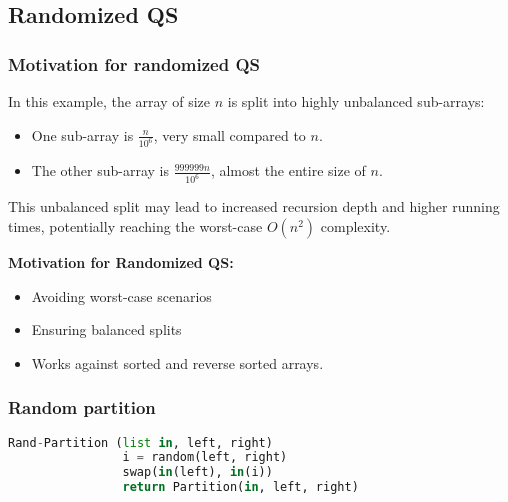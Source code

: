 \subsection{Randomized QS} 
    \subsubsection{Motivation for randomized QS}
    \begin{example}
        \begin{center}
        \end{center}
        
        \noindent In this example, the array of size \( n \) is split into highly unbalanced sub-arrays:
        \begin{itemize}
            \item One sub-array is \( \frac{n}{10^6} \), very small compared to \( n \).
            \item The other sub-array is \( \frac{999999n}{10^6} \), almost the entire size of \( n \).
        \end{itemize}
        \vspace{1em}

        \noindent This unbalanced split may lead to increased recursion depth and higher running times, potentially reaching the worst-case \( O(n^2) \) complexity.
        \vspace{1em}

        \textbf{Motivation for Randomized QS:}
        \begin{itemize}
            \item Avoiding worst-case scenarios
            \item Ensuring balanced splits
            \item Works against sorted and reverse sorted arrays.
        \end{itemize}
    \end{example}

    \subsubsection{Random partition}
    \begin{definition}
        \begin{lstlisting}[language=Python, caption={Rand-Partition Function Pseudocode}]
            Rand-Partition (list in, left, right)
                i = random(left, right)
                swap(in(left), in(i))
                return Partition(in, left, right)
        \end{lstlisting}
    \end{definition}

